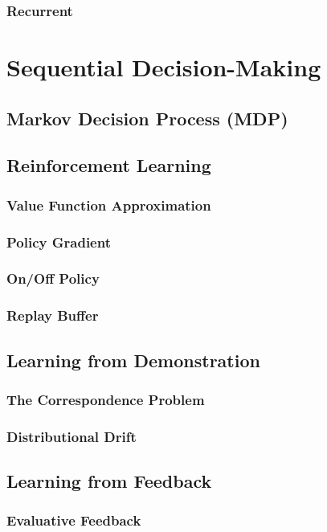 \subsubsection{Recurrent}

\section{Sequential Decision-Making}
\subsection{Markov Decision Process (MDP)}
\subsection{Reinforcement Learning}
\subsubsection{Value Function Approximation}
\subsubsection{Policy Gradient}
\subsubsection{On/Off Policy}
\subsubsection{Replay Buffer}
\subsection{Learning from Demonstration}
\subsubsection{The Correspondence Problem}
\subsubsection{Distributional Drift}
\subsection{Learning from Feedback}
\subsubsection{Evaluative Feedback}
